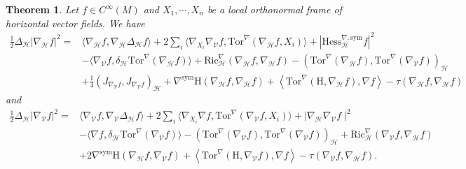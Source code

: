 \documentclass[10pt,a4paper]{amsart}
\newtheorem{theorem}{Theorem}
\newcommand{\Ho}{\mathcal H}
\newcommand{\V}{\mathcal V}
\begin{document}
	\begin{theorem}\label{Bochner}
		Let $f \in C^\infty (M)$ and  $X_1,\cdots,X_n$ be a local orthonormal frame of horizontal vector fields. We have
		\begin{align*}
			\frac{1}{2}\Delta_{\mathcal{H}} | \nabla_\Ho f|^2=&\langle \nabla_{\mathcal{H}} f , \nabla_{\mathcal{H}}\Delta_{\mathcal{H}} f \rangle+2\sum_i\langle \nabla_{X_i} \nabla_\V f, \mathrm{Tor}^\nabla(\nabla_{\mathcal{H}}f, X_i) \rangle+| \mathrm{Hess}_\Ho^{\nabla, \mathrm{sym}} f|^2\\
			&- \langle \nabla_\V f, \delta_\Ho \mathrm{Tor}^\nabla ( \nabla_\Ho f ) \rangle+\mathrm{Ric}_\Ho^\nabla(\nabla_{\mathcal{H}} f, \nabla_{\mathcal{H}} f )-(\mathrm{Tor}^\nabla (\nabla_\Ho f),\mathrm{Tor}^\nabla (\nabla_\V f) )_\Ho\\
			&+\frac{1}{4}( J_{\nabla_\V f} , J_{\nabla_\V f} )_\Ho+ \nabla^{\mathrm{sym}} \mathrm H(\nabla_\Ho f,\nabla_\Ho f)+\left\langle \mathrm{Tor}^\nabla (\mathrm H, \nabla_\Ho f), \nabla f \right\rangle -\tau(\nabla_\Ho f,\nabla_\Ho f)
		\end{align*}
		and
		\begin{align*}
			\frac{1}{2}\Delta_{\mathcal{H}} | \nabla_\V f|^2=&\langle \nabla_{\mathcal{V}} f , \nabla_{\mathcal{V}}\Delta_{\mathcal{H}} f \rangle+2\sum_i\langle \nabla_{X_i} \nabla f, \mathrm{Tor}^\nabla(\nabla_{\mathcal{V}}f, X_i) \rangle+\mid \nabla_{\mathcal{H}} \nabla_{\mathcal{V}} f \mid^2\\ 
			&-\langle \nabla f, \delta_\Ho \mathrm{Tor}^\nabla ( \nabla_\V f ) \rangle-(\mathrm{Tor}^\nabla (\nabla_\V f),\mathrm{Tor}^\nabla (\nabla_\V f) )_\Ho +\mathrm{Ric}^\nabla_\Ho(\nabla_\V f,\nabla_\Ho f)\\
            &+2\nabla^{\mathrm{sym}}\mathrm H(\nabla_\Ho f,\nabla_\V f)+\left\langle \mathrm{Tor}^\nabla (\mathrm H, \nabla_\V f), \nabla f \right\rangle-\tau(\nabla_\V f,\nabla_\Ho f).
		\end{align*}
	\end{theorem}
\end{document}

